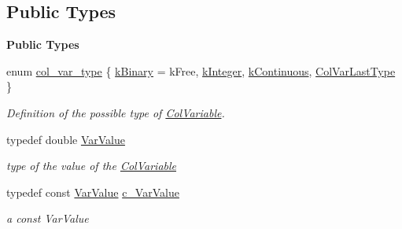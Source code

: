 \subsection*{Public Types}
\begin{Indent}\textbf{ Public Types}\par
\begin{DoxyCompactItemize}
\item 
enum \mbox{\hyperlink{class_s_m_spp__di__unipi__it_1_1_col_variable_ae6a9c27f20ec8030a1aef0c5b655c4e1}{col\+\_\+var\+\_\+type}} \{ \mbox{\hyperlink{class_s_m_spp__di__unipi__it_1_1_col_variable_ae6a9c27f20ec8030a1aef0c5b655c4e1a7ee9390c1fb4264c44b9d9112c7167d1}{k\+Binary}} = k\+Free, 
\mbox{\hyperlink{class_s_m_spp__di__unipi__it_1_1_col_variable_ae6a9c27f20ec8030a1aef0c5b655c4e1aa1acc5720dd4e85ceea5578a6cf14ae6}{k\+Integer}}, 
\mbox{\hyperlink{class_s_m_spp__di__unipi__it_1_1_col_variable_ae6a9c27f20ec8030a1aef0c5b655c4e1abe6ad916b46098fac21a307ea72f206e}{k\+Continuous}}, 
\mbox{\hyperlink{class_s_m_spp__di__unipi__it_1_1_col_variable_ae6a9c27f20ec8030a1aef0c5b655c4e1abba29120267827d90548967064ffbb9d}{Col\+Var\+Last\+Type}}
 \}
\begin{DoxyCompactList}\small\item\em Definition of the possible type of \mbox{\hyperlink{class_s_m_spp__di__unipi__it_1_1_col_variable}{Col\+Variable}}. \end{DoxyCompactList}\item 
typedef double \mbox{\hyperlink{class_s_m_spp__di__unipi__it_1_1_col_variable_a5f7c601f4a24317327fbd91b9c7cd951}{Var\+Value}}
\begin{DoxyCompactList}\small\item\em type of the value of the \mbox{\hyperlink{class_s_m_spp__di__unipi__it_1_1_col_variable}{Col\+Variable}} \end{DoxyCompactList}\item 
\mbox{\label{class_s_m_spp__di__unipi__it_1_1_col_variable_aa51e8c6ea70ce11b2c28485c5d9f3ed0}} 
typedef const \mbox{\hyperlink{class_s_m_spp__di__unipi__it_1_1_col_variable_a5f7c601f4a24317327fbd91b9c7cd951}{Var\+Value}} \mbox{\hyperlink{class_s_m_spp__di__unipi__it_1_1_col_variable_aa51e8c6ea70ce11b2c28485c5d9f3ed0}{c\+\_\+\+Var\+Value}}
\begin{DoxyCompactList}\small\item\em a const Var\+Value \end{DoxyCompactList}\end{DoxyCompactItemize}
\end{Indent}
